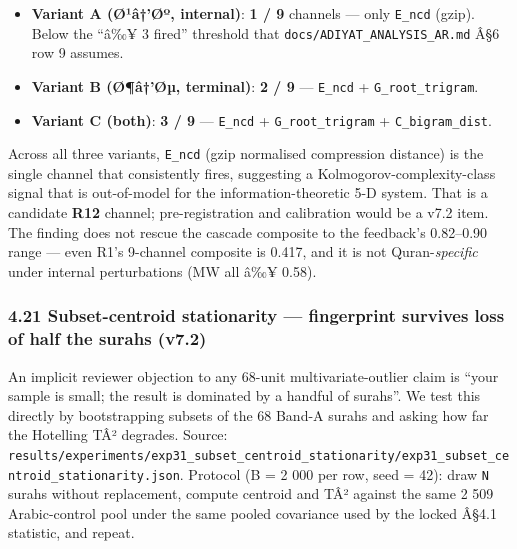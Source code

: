 \documentclass[
]{article}
\providecommand{\tightlist}{%
  \setlength{\itemsep}{0pt}\setlength{\parskip}{0pt}}
\begin{document}
\begin{itemize}
\tightlist
\item
  \textbf{Variant A (Ø¹â†'Øº, internal)}: \textbf{1 / 9} channels ---
  only \texttt{E\_ncd} (gzip). Below the ``â‰¥ 3 fired'' threshold that
  \texttt{docs/ADIYAT\_ANALYSIS\_AR.md} Â§6 row 9 assumes.
\item
  \textbf{Variant B (Ø¶â†'Øµ, terminal)}: \textbf{2 / 9} ---
  \texttt{E\_ncd} + \texttt{G\_root\_trigram}.
\item
  \textbf{Variant C (both)}: \textbf{3 / 9} --- \texttt{E\_ncd} +
  \texttt{G\_root\_trigram} + \texttt{C\_bigram\_dist}.
\end{itemize}

Across all three variants, \texttt{E\_ncd} (gzip normalised compression
distance) is the single channel that consistently fires, suggesting a
Kolmogorov-complexity-class signal that is out-of-model for the
information-theoretic 5-D system. That is a candidate \textbf{R12}
channel; pre-registration and calibration would be a v7.2 item. The
finding does not rescue the cascade composite to the feedback's
0.82--0.90 range --- even R1's 9-channel composite is 0.417, and it is
not Quran-\emph{specific} under internal perturbations (MW all â‰¥
0.58).

\subsubsection{4.21 Subset-centroid stationarity --- fingerprint
survives loss of half the surahs
(v7.2)}\label{subset-centroid-stationarity-fingerprint-survives-loss-of-half-the-surahs-v7.2}

An implicit reviewer objection to any 68-unit multivariate-outlier claim
is ``your sample is small; the result is dominated by a handful of
surahs''. We test this directly by bootstrapping subsets of the 68
Band-A surahs and asking how far the Hotelling TÂ² degrades. Source:
\texttt{results/experiments/exp31\_subset\_centroid\_stationarity/exp31\_subset\_centroid\_stationarity.json}.
Protocol (B = 2 000 per row, seed = 42): draw \texttt{N} surahs without
replacement, compute centroid and TÂ² against the same 2 509
Arabic-control pool under the same pooled covariance used by the locked
Â§4.1 statistic, and repeat.
\end{document}
